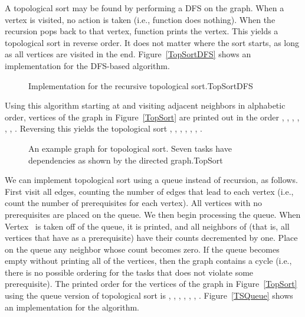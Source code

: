 A topological sort may be found by performing a DFS on the graph.
When a vertex is visited, no action is taken (i.e., function
 does nothing).
When the recursion pops back to that vertex, function
 prints the vertex.
This yields a topological sort in reverse order.
It does not matter where the sort starts, as long as all vertices
are visited in the end.
Figure~\ref{TopSortDFS} shows an implementation for the DFS-based algorithm.

\begin{figure}
\vspace{-\bigskipamount}
{Implementation for the recursive topological sort.}{TopSortDFS}
\end{figure}

Using this algorithm starting at  and visiting adjacent
neighbors in alphabetic order, vertices of the graph in
Figure~\ref{TopSort} are printed out in the order ,
, , , , , .
Reversing this yields the topological sort
, , , , , ,
.

\begin{figure}
\vspace{-\bigskipamount}\vspace{-\medskipamount}

{An example graph for topological sort.
Seven tasks have dependencies as shown by the directed
graph.}{TopSort}
\vspace{\medskipamount}
\end{figure}

We can implement topological sort using a queue
instead of recursion, as follows.
First visit all edges, counting the number of
edges that lead to each vertex (i.e., count the number of
prerequisites for each vertex).
All vertices with no prerequisites are placed on the queue.
We then begin processing the queue.
When Vertex~ is taken off of the queue, it is printed, and all
neighbors of  (that is, all vertices that have  as a
prerequisite) have their counts decremented by one.
Place on the queue any neighbor whose count becomes zero.
If the queue becomes empty without printing all of the vertices, then
the graph contains a cycle (i.e., there is no possible ordering
for the tasks that does not violate some prerequisite).
The printed order for the vertices of the graph in
Figure~\ref{TopSort} using the queue version of topological sort is
, , , , , , .
Figure~\ref{TSQueue} shows an implementation for the algorithm.

